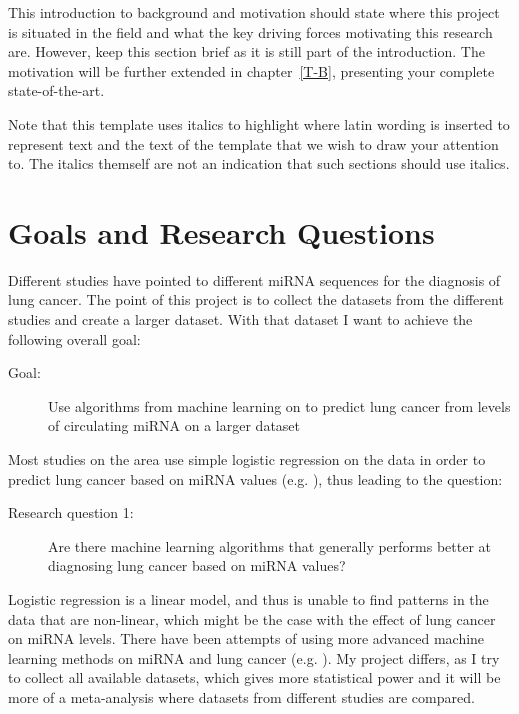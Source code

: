 This introduction to background and motivation should state where this project is situated in the field and what the key driving forces motivating this research are. However, keep this section brief as it is still part of the introduction. The motivation will be further extended in chapter~\ref{T-B}, presenting your complete state-of-the-art. 

Note that this template uses italics to highlight where latin wording is inserted to represent text and the text of the template that we wish to draw your attention to. The italics themself are not an indication that such sections should use italics.  
\fi

\section{Goals and Research Questions}
\label{sec:Goals and Research Questions}


Different studies have pointed to different miRNA sequences for the diagnosis of lung cancer. The point of this project is to collect the datasets from the different studies and create a larger dataset. With that dataset I want to achieve the following overall goal:

\begin{description}
\item[Goal:] Use algorithms from machine learning on to predict lung cancer from levels of circulating miRNA on a larger dataset
\end{description}

Most studies on the area use simple logistic regression on the data in order to predict lung cancer based on miRNA values (e.g. \citep{Wozniak2015,niu2019}), thus leading to the question:

\begin{description}
\item[Research question 1:] Are there machine learning algorithms that generally performs better at diagnosing lung cancer based on miRNA values?
\end{description}

Logistic regression is a linear model, and thus is unable to find patterns in the data that are non-linear, which might be the case with the effect of lung cancer on miRNA levels. There have been attempts of using more advanced machine learning methods on miRNA and lung cancer (e.g. \citep{maskinrna}). My project differs, as I try to collect all available datasets, which gives more statistical power and it will be more of a meta-analysis where datasets from different studies are compared.

